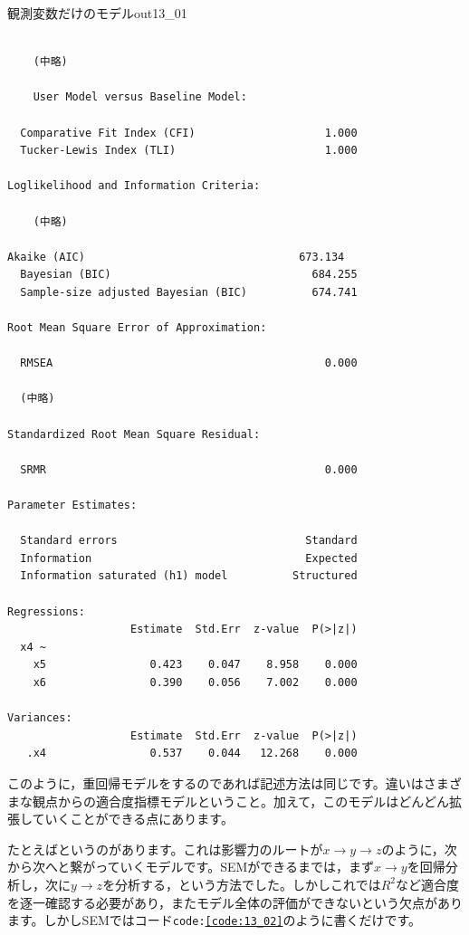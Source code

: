 \documentclass{ltjsbook}
\begin{document}
\begin{Rscreen}{観測変数だけのモデル}{out13_01}
	\begin{verbatim}

    (中略)

    User Model versus Baseline Model:

  Comparative Fit Index (CFI)                    1.000
  Tucker-Lewis Index (TLI)                       1.000

Loglikelihood and Information Criteria:

    (中略)

Akaike (AIC)                                 673.134
  Bayesian (BIC)                               684.255
  Sample-size adjusted Bayesian (BIC)          674.741

Root Mean Square Error of Approximation:

  RMSEA                                          0.000

  (中略)

Standardized Root Mean Square Residual:

  SRMR                                           0.000

Parameter Estimates:

  Standard errors                             Standard
  Information                                 Expected
  Information saturated (h1) model          Structured

Regressions:
                   Estimate  Std.Err  z-value  P(>|z|)
  x4 ~                                                
    x5                0.423    0.047    8.958    0.000
    x6                0.390    0.056    7.002    0.000

Variances:
                   Estimate  Std.Err  z-value  P(>|z|)
   .x4                0.537    0.044   12.268    0.000
\end{verbatim}
\end{Rscreen}

このように，重回帰モデルをするのであれば記述方法は同じです。違いはさまざまな観点からの適合度指標モデルということ。加えて，このモデルはどんどん拡張していくことができる点にあります。

たとえばというのがあります。これは影響力のルートが$x \to y \to z$のように，次から次へと繋がっていくモデルです。SEMができるまでは，まず$x \to y$を回帰分析し，次に$y \to z$を分析する，という方法でした。しかしこれでは$R^2$など適合度を逐一確認する必要があり，またモデル全体の評価ができないという欠点があります。しかしSEMではコード\texttt{code:\ref{code:13_02}}のように書くだけです。
\end{document}
